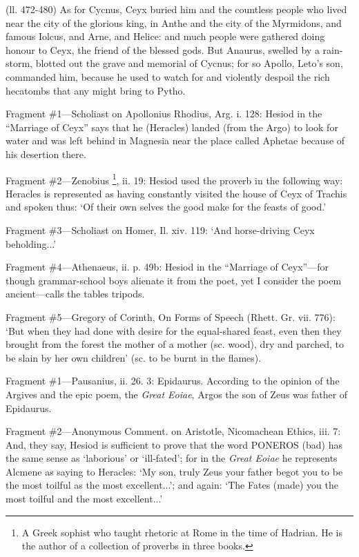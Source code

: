 (ll. 472-480) As for Cycnus, Ceyx buried him and the countless people who lived
near the city of the glorious king, in Anthe and the city of the Myrmidons, and
famous Iolcus, and Arne, and Helice: and much people were gathered doing honour
to Ceyx, the friend of the blessed gods. But Anaurus, swelled by a rain-storm,
blotted out the grave and memorial of Cycnus; for so Apollo, Leto’s son,
commanded him, because he used to watch for and violently despoil the rich
hecatombs that any might bring to Pytho.


Fragment \#1—Scholiast on Apollonius Rhodius, Arg. i. 128: Hesiod in the
“Marriage of Ceyx” says that he (Heracles) landed (from the Argo)
to look for water and was left behind in Magnesia near the place called Aphetae
because of his desertion there.

Fragment \#2—Zenobius \footnote{A Greek sophist who taught
rhetoric at Rome in the time of Hadrian. He is the author of a collection of
proverbs in three books.}, ii. 19: Hesiod used the proverb
in the following way: Heracles is represented as having constantly visited the
house of Ceyx of Trachis and spoken thus: ‘Of their own selves the good
make for the feasts of good.’

Fragment \#3—Scholiast on Homer, Il. xiv. 119: ‘And horse-driving
Ceyx beholding...’

Fragment \#4—Athenaeus, ii. p. 49b: Hesiod in the “Marriage of
Ceyx”—for though grammar-school boys alienate it from the poet, yet
I consider the poem ancient—calls the tables tripods.

Fragment \#5—Gregory of Corinth, On Forms of Speech (Rhett. Gr. vii. 776):
‘But when they had done with desire for the equal-shared feast, even then
they brought from the forest the mother of a mother (sc. wood), dry and
parched, to be slain by her own children’ (sc. to be burnt in the
flames).


Fragment \#1—Pausanius, ii. 26. 3: Epidaurus. According to the opinion of
the Argives and the epic poem, the \emph{Great Eoiae}, Argos the son of
Zeus was father of Epidaurus.

Fragment \#2—Anonymous Comment. on Aristotle, Nicomachean Ethics, iii. 7:
And, they say, Hesiod is sufficient to prove that the word PONEROS (bad) has
the same sense as ‘laborious’ or ‘ill-fated’; for in
the \emph{Great Eoiae} he represents Alcmene as saying to Heracles:
‘My son, truly Zeus your father begot you to be the most toilful as the
most excellent...’; and again: ‘The Fates (made) you the most
toilful and the most excellent...’

